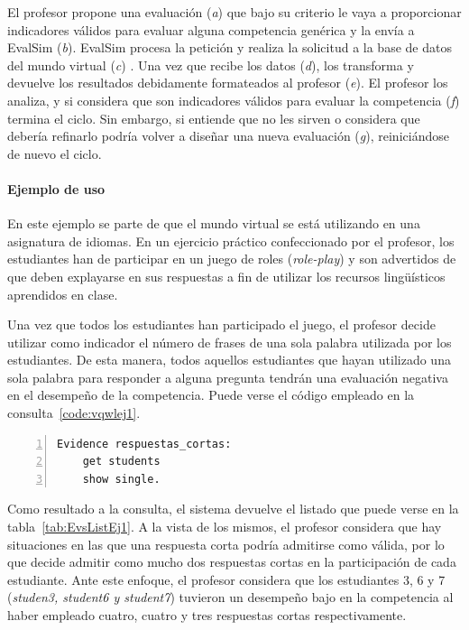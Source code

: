 El profesor propone una evaluación (\emph{a}) que bajo su criterio le vaya a proporcionar indicadores válidos para evaluar alguna competencia genérica y la envía a EvalSim (\emph{b}). EvalSim procesa la petición y realiza la solicitud a la base de datos del mundo virtual (\emph{c}) . Una vez que recibe los datos (\emph{d}), los transforma y devuelve los resultados debidamente formateados al profesor (\emph{e}). El profesor los analiza, y si considera que son indicadores válidos para evaluar la competencia (\emph{f}) termina el ciclo. Sin embargo, si entiende que no les sirven o considera que debería refinarlo podría volver a diseñar una nueva evaluación (\emph{g}), reiniciándose de nuevo el ciclo.


\paragraph*{Ejemplo de uso}

En este ejemplo se parte de que el mundo virtual se está utilizando en una asignatura de idiomas. En un ejercicio práctico confeccionado por el profesor, los estudiantes han de participar en un juego de roles (\emph{role-play}) y son advertidos de que deben explayarse en sus respuestas a fin de utilizar los recursos lingüísticos aprendidos en clase.

Una vez que todos los estudiantes han participado el juego, el profesor decide utilizar como indicador el número de frases de una sola palabra utilizada por los estudiantes. De esta manera, todos aquellos estudiantes que hayan utilizado una sola palabra para responder a alguna pregunta tendrán una evaluación negativa en el desempeño de la competencia. Puede verse el código empleado en la consulta~\ref{code:vqwlej1}.

\begin{lstlisting}[caption=Respuestas de una sola palabra, label=code:vqwlej1,numbers=left, captionpos=b, morekeywords={Evidence,get, students, single, show, words, sentences, turns, time, points}]
Evidence respuestas_cortas:
    get students
    show single.
\end{lstlisting}

Como resultado a la consulta, el sistema devuelve el listado que puede verse en la tabla~\ref{tab:EvsListEj1}. A la vista de los mismos, el profesor considera que hay situaciones en las que una respuesta corta podría admitirse como válida, por lo que decide admitir como mucho dos respuestas cortas en la participación de cada estudiante. Ante este enfoque, el profesor considera que los estudiantes 3, 6 y 7 (\emph{studen3, student6 y student7}) tuvieron un desempeño bajo en la competencia al haber empleado cuatro, cuatro y tres respuestas cortas respectivamente.

